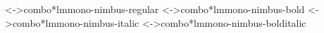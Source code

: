  {<->combo*lmmono-nimbus-regular}{}
 {<->combo*lmmono-nimbus-bold}{}
 {<->combo*lmmono-nimbus-italic}{}
 {<->combo*lmmono-nimbus-bolditalic}{}

\renewcommand{\rmdefault}{lmroman-nimbus}
\renewcommand{\sfdefault}{lmsans-nimbus}
\renewcommand{\ttdefault}{lmmono-nimbus}
